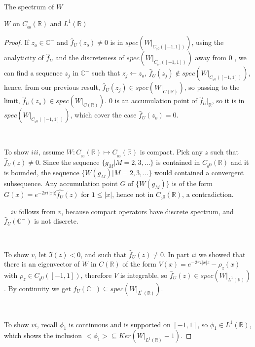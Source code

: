 \documentclass[12pt]{article}
\begin{document}
\begin{section}{The spectrum of $W$ }
\begin{subsection}{$W$ on $C_{_{0\!0}}(\mathbb{R})$ and $L^1(\mathbb{R})$}
\begin{proof}
If $z_o \in \mathbb{C}^-$ and $\hat{f}_U(z_o) \ne 0$ is in $spec\left(W\Big|_{C_{_0\!0}([-1,1])}   \right) $,  using the analyticity of $\hat{f}_U$ and the discreteness of $spec\left(W\Big|_{C_{_0\!0}([-1,1])}   \right) $ away from $0$ , we can find a sequence ${z_j}$ in $\mathbb{C}^-$ such that $z_j \leftarrow z_o$, $\hat{f}_U(z_j) \notin spec\left(W\Big|_{C_{_0\!0}([-1,1])}   \right) $, hence, from our previous result, $\hat{f}_U(z_j) \in spec\left(W\Big|_{C(\mathbb{R})}   \right) $, so passing to the limit, $\hat{f}_U(z_o) \in spec\left(W\Big|_{C(\mathbb{R})}   \right) $. $0$ is an accumulation point of $\hat{f}_U\Big|_{\mathbb{R}}$, so it is in $spec\left(W\Big|_{C_{_0\!0}([-1,1])}   \right) $, which cover the case $\hat{f}_U(z_o) = 0$.  

\  
\  

To show $iii$, assume $W: C_{_{0\!0}}(\mathbb{R}) \longmapsto C_{_{0\!0}}(\mathbb{R}) $ is compact. Pick any $z$ such that $\hat{f}_U(z) \ne 0$. Since the sequence  $\{g_M | M=2,3,...\}$ is contained in $ C_{_0\!0}(\mathbb{R})$ and it is bounded, the sequence $\{W(g_M) | M=2,3,...\}$ would contained a convergent subsequence. Any accumulation point $G$ of $\{W(g_M)\}$ is of the form $G(x) =  e^{-2 \pi i |x| \xi} \hat{f_U}(z) $ for $1 \le |x|$, hence not in $ C_{_0\!0}(\mathbb{R})$, a contradiction. 

\  
\  
$iv$ follows from $v$, because compact operators have discrete spectrum, and $\hat{f}_U(\mathbb{C}^-)$ is not discrete.  

\  
\  

To show $v$, let $\Im(z)<0$, and such that $\hat{f}_U(z) \ne 0$. In part $ii$ we showed that there is an eigenvector of $W$ in $C(\mathbb{R})$ of the form $V(x) = e^{-2 \pi i |x| z} - \rho_z(x)$ with $\rho_z \in C_{_0\!0}([-1,1])$, therefore $V$ is integrable, so $\hat{f}_U(z) \in spec(W\Big|_{L^1(\mathbb{R})}) $. By continuity we get $\hat{f}_U(\mathbb{C}^-) \subseteq spec(W\Big|_{L^1(\mathbb{R})}) $.  

\  
\  

To show $vi$, recall $\phi_1$ is continuous and is supported on $[-1,1]$, so $\phi_1 \in L^1(\mathbb{R})$, which shows the inclusion $ <\phi_1> \subseteq Ker\left( W\Big|_{L^1(\mathbb{R})} - 1 \right) $.


\end{proof}
\end{subsection}
\end{section}
\end{document}
